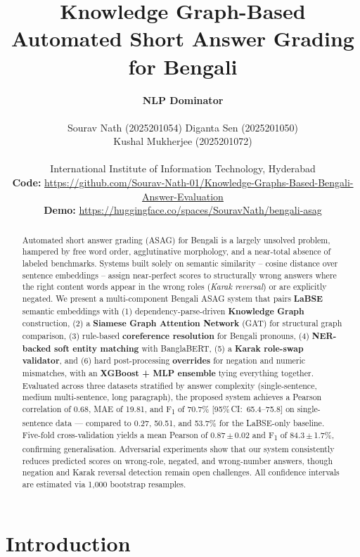 \documentclass[11pt]{article}
\title{Knowledge Graph-Based Automated Short Answer Grading for Bengali}
\author{
  \textbf{NLP Dominator} \\
  \\
  Sourav Nath (2025201054) \quad Diganta Sen (2025201050) \\
  Kushal Mukherjee (2025201072) \\
  \\
  International Institute of Information Technology, Hyderabad \\
  \small\textbf{Code:} \url{https://github.com/Sourav-Nath-01/Knowledge-Graphs-Based-Bengali-Answer-Evaluation} \\
  \small\textbf{Demo:} \url{https://huggingface.co/spaces/SouravNath/bengali-asag}
}
\begin{document}
\maketitle

\begin{abstract}
Automated short answer grading (ASAG) for Bengali is a largely unsolved problem, hampered by free word order, agglutinative morphology, and a near-total absence of labeled benchmarks. Systems built solely on semantic similarity -- cosine distance over sentence embeddings -- assign near-perfect scores to structurally wrong answers where the right content words appear in the wrong roles (\emph{Karak reversal}) or are explicitly negated. We present a multi-component Bengali ASAG system that pairs \textbf{LaBSE} semantic embeddings with (1) dependency-parse-driven \textbf{Knowledge Graph} construction, (2) a \textbf{Siamese Graph Attention Network} (GAT) for structural graph comparison, (3) rule-based \textbf{coreference resolution} for Bengali pronouns, (4) \textbf{NER-backed soft entity matching} with BanglaBERT, (5) a \textbf{Karak role-swap validator}, and (6) hard post-processing \textbf{overrides} for negation and numeric mismatches, with an \textbf{XGBoost + MLP ensemble} tying everything together. Evaluated across three datasets stratified by answer complexity (single-sentence, medium multi-sentence, long paragraph), the proposed system achieves a Pearson correlation of 0.68, MAE of 19.81, and F\textsubscript{1} of 70.7\% \mbox{[95\%\,CI: 65.4--75.8]} on single-sentence data --- compared to 0.27, 50.51, and 53.7\% for the LaBSE-only baseline. Five-fold cross-validation yields a mean Pearson of 0.87\,$\pm$\,0.02 and F\textsubscript{1} of 84.3\,$\pm$\,1.7\%, confirming generalisation. Adversarial experiments show that our system consistently reduces predicted scores on wrong-role, negated, and wrong-number answers, though negation and Karak reversal detection remain open challenges. All confidence intervals are estimated via 1{,}000 bootstrap resamples.
\end{abstract}

\section{Introduction}
\end{document}
